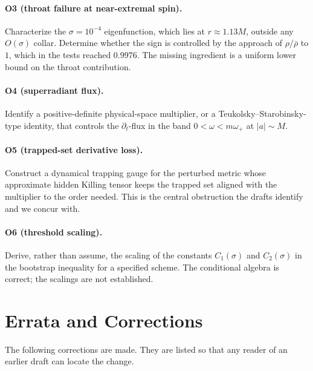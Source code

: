 \documentclass[11pt,a4paper]{article}
\theoremstyle{remark}
\theoremstyle{definition}
\begin{document}
\paragraph{O3 (throat failure at near-extremal spin).} Characterize the $\sigma=10^{-4}$ eigenfunction, which lies at $r\approx1.13M$, outside any $O(\sigma)$ collar. Determine whether the sign is controlled by the approach of $\rho/\bar\rho$ to $1$, which in the tests reached $0.9976$. The missing ingredient is a uniform lower bound on the throat contribution.

\paragraph{O4 (superradiant flux).} Identify a positive-definite physical-space multiplier, or a Teukolsky--Starobinsky-type identity, that controls the $\partial_t$-flux in the band $0<\omega<m\omega_+$ at $|a|\sim M$.

\paragraph{O5 (trapped-set derivative loss).} Construct a dynamical trapping gauge for the perturbed metric whose approximate hidden Killing tensor keeps the trapped set aligned with the multiplier to the order needed. This is the central obstruction the drafts identify and we concur with.

\paragraph{O6 (threshold scaling).} Derive, rather than assume, the scaling of the constants $C_1(\sigma)$ and $C_2(\sigma)$ in the bootstrap inequality for a specified scheme. The conditional algebra is correct; the scalings are not established.

\section{Errata and Corrections}
\label{sec:errata}

The following corrections are made. They are listed so that any reader of an earlier draft can locate the change.
\end{document}
